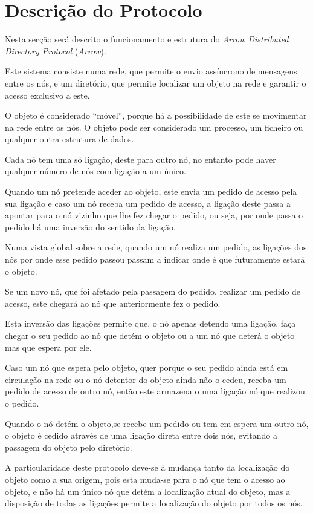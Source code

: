 \section{Descrição do Protocolo}

Nesta secção será descrito o funcionamento e estrutura do \textit{Arrow Distributed Directory Protocol} (\emph{Arrow}). 

Este sistema consiste numa rede, que permite o envio assíncrono de mensagens entre os nós, e um diretório, que permite localizar um objeto na rede e garantir o acesso exclusivo a este. 

O objeto é considerado ``móvel'', porque há a possibilidade de este se movimentar na rede entre os nós.
O objeto pode ser considerado um processo, um ficheiro ou qualquer outra estrutura de dados.

Cada nó tem uma só ligação, deste para outro nó, no entanto pode haver qualquer número de nós com ligação a um único.

Quando um nó pretende aceder ao objeto, este envia um pedido de acesso pela sua ligação e
caso um nó receba um pedido de acesso, a ligação deste passa a apontar para o nó vizinho que lhe fez chegar o pedido, ou seja, por onde passa o pedido há uma inversão do sentido da ligação.

Numa vista global sobre a rede, quando um nó realiza um pedido, as ligações dos nós por onde esse pedido passou passam a indicar onde é que futuramente estará o objeto.

Se um novo nó, que foi afetado pela passagem do pedido, realizar um pedido de acesso, este chegará ao nó que anteriormente fez o pedido.

Esta inversão das ligações permite que, o nó apenas detendo uma ligação, faça chegar o seu pedido ao nó que detém o objeto ou a um nó que deterá o objeto mas que espera por ele.

Caso um nó que espera pelo objeto, quer porque o seu pedido ainda está em circulação na rede ou o nó detentor do objeto ainda não o cedeu, receba um pedido de acesso de outro nó, então este armazena o uma ligação nó que realizou o pedido.

Quando o nó detém o objeto,se recebe um pedido ou tem em espera um outro nó, o objeto é cedido através de uma ligação direta entre dois nós, evitando a passagem do objeto pelo diretório.

A particularidade deste protocolo deve-se à mudança tanto da localização do objeto como a sua origem, pois esta muda-se para o nó que tem o acesso ao objeto, e não há um único nó que detém a localização atual do objeto, mas a disposição de todas as ligações permite a localização do objeto por todos os nós.

